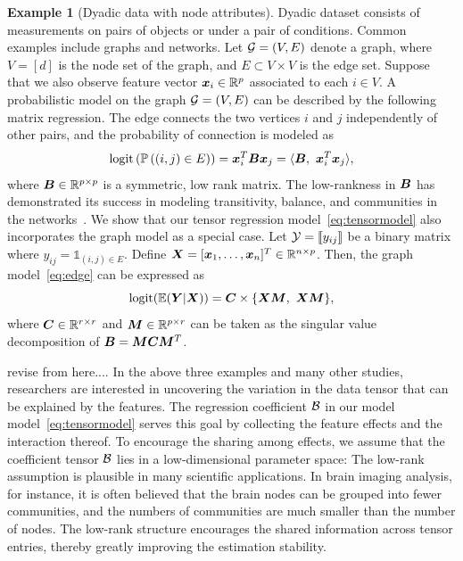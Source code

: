 \documentclass[12pt]{article}
\theoremstyle{plain}
\theoremstyle{definition}
\newtheorem{example}{Example}
\begin{document}
 \begin{example}[Dyadic data with node attributes] Dyadic dataset consists of measurements on pairs of objects or under a pair of conditions. Common examples include graphs and networks. Let $\mathcal{G}=(V,E)$ denote a graph, where $V=[d]$ is the node set of the graph, and $E\subset V\times V$ is the edge set. Suppose that we also observe feature vector $\bm x_i\in\mathbb{R}^p$ associated to each $i\in V$. A probabilistic model on the graph $\mathcal{G}=(V,E)$ can be described by the following matrix regression. The edge connects the two vertices $i$ and $j$ independently of other pairs, and the probability of connection is modeled as
\begin{equation}\label{eq:edge}
 \text{logit}\left(\mathbb{P}\left((i,j)\in E\right)\right)=\mx^T_i\mB\mx_j=\langle \mB,\ \mx^T_i\mx_j\rangle,
 \end{equation}
 where $\bm B\in\mathbb{R}^{p\times p}$ is a symmetric, low rank matrix. The low-rankness in $\bm B$ has demonstrated its success in modeling transitivity, balance, and communities in the networks~\citep{hoff2005bilinear}. We show that our tensor regression model~\eqref{eq:tensormodel} also incorporates the graph model as a special case. Let $\mathcal{Y}=\llbracket y_{ij} \rrbracket$ be a binary matrix where $y_{ij}=\mathds{1}_{(i,j)\in E}$. Define $\bm X=[\bm x_1,\ldots,\bm x_n]^T\in\mathbb{R}^{n\times p}$. Then, the graph model~\eqref{eq:edge} can be expressed as
 \[
 \text{logit}(\mathbb{E}(\mY|\mX))=\mC\times\{\mX\mM,\ \mX\mM\}, 
  \]
  where $\bm C\in\mathbb{R}^{r\times r}$ and $\bm M\in\mathbb{R}^{p\times r}$ can be taken as the singular value decomposition of $\bm B=\bm M\bm C\bm M^T$. 
  \end{example}

{\color{red}revise from here....}
In the above three examples and many other studies, researchers are interested in uncovering the variation in the data tensor that can be explained by the features. The regression coefficient $\mathcal{B}$ in our model model~\eqref{eq:tensormodel} serves this goal by collecting the feature effects and the interaction thereof.  
To encourage the sharing among effects, we assume that the coefficient tensor $\mathcal{B}$ lies in a low-dimensional parameter space:
The low-rank assumption is plausible in many scientific applications. In brain imaging analysis, for instance, it is often believed that the brain nodes can be grouped into fewer communities, and the numbers of communities are much smaller than the number of nodes. The low-rank structure encourages the shared information across tensor entries, thereby greatly improving the estimation stability. 
\end{document}
